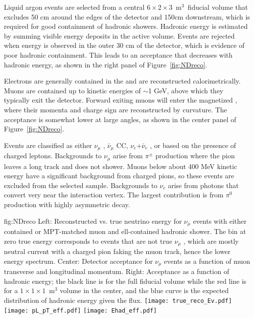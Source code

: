 Liquid argon events are selected from a central $6 \times 2 \times 3$~m$^{3}$~fiducial volume that excludes 50 cm around the edges of the detector and 150cm downstream, which is required for good containment of hadronic showers. Hadronic energy is estimated by summing visible energy deposits in the active  volume. Events are rejected when energy is observed in the outer 30 cm of the detector, which is evidence of poor hadronic containment. This leads to an acceptance that decreases with hadronic energy, as shown in the right panel of Figure~\ref{fig:NDreco}.

Electrons are generally contained in the  and are reconstructed calorimetrically. Muons are contained up to kinetic energies of $\sim$1 GeV, above which they typically exit the detector. Forward exiting muons will enter the magnetized , where their momenta and charge sign are reconstructed by curvature. The acceptance is somewhat lower at large angles, as shown in the center panel of Figure~\ref{fig:NDreco}.

Events are classified as either $\nu_{\mu}$ , $\bar{\nu}_{\mu}$ CC, $\nu_{e}$+$\bar{\nu}_{e}$ , or  based on the presence of charged leptons. Backgrounds to $\nu_{\mu}$  arise from  $\pi^{\pm}$ production where the pion leaves a long track and does not shower. Muons below about 400 MeV kinetic energy have a significant background from charged pions, so these  events are excluded from the selected sample. Backgrounds to $\nu_{e}$  arise from photons that convert very near the interaction vertex. The largest contribution is from $\pi^{0}$ production with highly asymmetric decay.

\begin{dunefigure}[ND reconstruction]{fig:NDreco}
{Left: Reconstructed vs. true neutrino energy for $\nu_{\mu}$  events with either contained or MPT-matched muon and ell-contained hadronic shower. The bin at zero true energy corresponds to events that are not true $\nu_{\mu}$ , which are mostly neutral current with a charged pion faking the muon track, hence the lower energy spectrum. Center: Detector acceptance for $\nu_{\mu}$  events as a function of muon transverse and longitudinal momentum. Right: Acceptance as a function of hadronic energy; the black line is for the full fiducial volume while the red line is for a $1 \times 1 \times 1$~m$^{3}$ volume in the center, and the blue curve is the expected distribution of hadronic energy given the  flux.}
 \texttt{[image: true\_reco\_Ev.pdf]}
 \texttt{[image: pL\_pT\_eff.pdf]}
 \texttt{[image: Ehad\_eff.pdf]}
\end{dunefigure}

